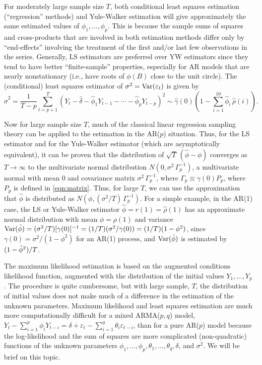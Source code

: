 For moderately large sample size $T$, both conditional least squares estimation (``regression'' methods) and Yule-Walker estimation will give approximately the same estimated values of $\phi_1, \ldots, \phi_p$. This is because the sample sums of squares and cross-products that are involved in both estimation methods differ only by ``end-effects'' involving the treatment of the first and/or last few observations in the series. Generally, LS estimators are preferred over YW estimators since they tend to have better ``finite-sample'' properties, especially for AR models that are nearly nonstationary (i.e., have roots of $\phi(B)$ close to the unit circle). The (conditional) least squares estimator of $\sigma^2 = \operatorname{Var}(\varepsilon_t)$ is given by
	\[
	\hat{\sigma}^2 =  \frac{1}{T - p}\sum_{t=p+1}^T (Y_t - \hat{\delta} - \hat{\phi}_1Y_{t-1} - \cdots - \hat{\phi}_pY_{t-p})^2 \sim \hat{\gamma}(0) \left( 1 - \sum_{i=1}^{10} \hat{\phi}_i \, \hat{\rho}(i) \right).
	\]


Now for large sample size $T$, much of the classical linear regression sampling theory can be applied to the estimation in the AR($p$) situation. Thus, for the LS estimator and for the Yule-Walker estimator (which are asymptotically equivalent), it can be proven that the distribution of $\sqrt{T}\,(\hat{\phi} - \phi)$ converges as $T \to \infty$ to the multivariate normal distribution $N(0,\sigma^2\,\Gamma_p^{-1})$, a multivariate normal with mean 0 and covariance matrix $\sigma^2\,\Gamma_p^{-1}$, where $\Gamma_p \equiv \gamma(0)P_p$, where $P_p$ is defined in \eqref{eqn:matrix}. Thus, for large $T$, we can use the approximation that $\hat{\phi}$ is distributed as $N(\phi,(\sigma^2/T)\,\Gamma_p^{-1})$. For a simple example, in the AR(1) case, the LS or Yule-Walker estimator $\hat{\phi} = r(1) = \hat{\rho}(1)$ has an approximate normal distribution with mean $\phi = \rho(1)$ and variance $\operatorname{Var}(\hat{\phi}) = (\sigma^2/T)[\gamma(0)]^{-1} = (1/T)(\sigma^2/\gamma(0)) = (1/T)(1 - \phi^2)$, since $\gamma(0) = \sigma^2/(1 - \phi^2)$ for an AR(1) process, and $\operatorname{Var}(\hat{\phi})$ is estimated by $(1 - \hat{\phi}^2\hspace{0.01cm})/T$.


The maximum likelihood estimation is based on the augmented conditions likelihood function, augmented with the distribution of the initial values $Y_1, \ldots, Y_p$. The procedure is quite cumbersome, but with large sample, $T$, the distribution of initial values does not make much of a difference in the estimation of the unknown parameters. Maximum likelihood and least squares estimation are much more computationally difficult for a mixed ARMA($p,q$) model, $Y_t - \sum_{i=1}^p \phi_i Y_{t-i} = \delta + \varepsilon_t - \sum_{i=1}^q\theta_i\varepsilon_{t-i}$, than for a pure AR($p$) model because the log-likelihood and the sum of squares are more complicated (non-quadratic) functions of the unknown parameters $\phi_1,\ldots,\phi_p,\theta_1,\ldots,\theta_q, \delta$, and $\sigma^2$. We will be brief on this topic.


